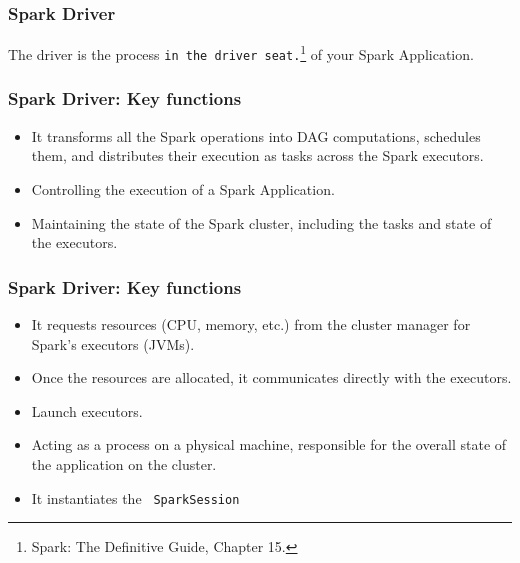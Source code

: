 \begin{frame}
    \frametitle{Spark Driver}
    The driver is the process \texttt{\color{blue}in the driver seat.}\footnote{Spark: The Definitive Guide, Chapter 15.} of your Spark Application.

\end{frame}

\begin{frame}
    \frametitle{Spark Driver: Key functions}


    \begin{itemize}
        \item It transforms all the Spark operations into DAG computations, schedules them, and distributes their execution as tasks across the Spark executors.\pause
        \item Controlling the execution of a Spark Application.\pause
        \item Maintaining the state of the Spark cluster, including the tasks and state of the executors.\pause

    \end{itemize}

\end{frame}


\begin{frame}
    \frametitle{Spark Driver: Key functions}

    \begin{itemize}
        \item It requests resources  (CPU, memory, etc.) from the cluster manager for Spark’s executors (JVMs).\pause
        \item Once the resources are allocated, it communicates directly with the executors.\pause
        \item Launch executors.\pause
        \item Acting as a process on a physical machine, responsible for the overall state of the application on the cluster.\pause
        \item It instantiates the \texttt{\color{blue} SparkSession}\pause

    \end{itemize}

\end{frame}



